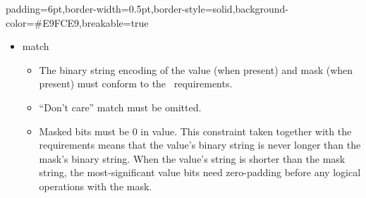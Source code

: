 \documentclass[11pt]{article}
\begin{document}
{%
\begin{mdbmargintb}{6pt}{6pt}%
\begin{mdblock}{padding=6pt,border-width=0.5pt,border-style=solid,background-color=\#E9FCE9,breakable=true}%
\begin{mdpre}%
\end{mdpre}%
\end{mdblock}%
\end{mdbmargintb}%

\begin{itemize}[noitemsep,topsep=\mdcompacttopsep]%

\item{} match

\begin{itemize}[noitemsep,topsep=\mdcompacttopsep]%

\item{}The binary string encoding of the value (when present) and mask (when
present) must conform to the~ requirements.%

\item{}\textquotedblleft{}Don't care\textquotedblright{} match must be omitted.%

\item{}Masked bits must be 0 in value.  This constraint taken together
with the~ requirements means that the
value's binary string is never longer than the mask's binary string.
When the value's string is shorter than the mask string, the
most-significant value bits need zero-padding before any logical
operations with the mask.%
\end{itemize}%
\end{itemize}%

}
\end{document}
